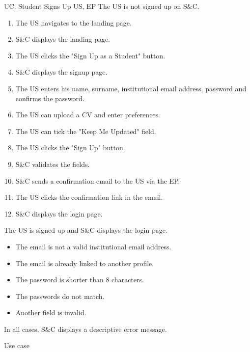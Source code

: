 \clearpage
\begin{usecase}
    {UC\theuc. Student Signs Up}
    {US, EP}
    {The US is not signed up on S\&C.}
    {\begin{enumerate}[leftmargin=*]
        \item The US navigates to the landing page.
        \item S\&C displays the landing page.
        \item The US clicks the "Sign Up as a Student" button.
        \item S\&C displays the signup page.
        \item The US enters his name, surname, institutional email address, password and confirms the password.
        \item The US can upload a CV and enter preferences.
        \item The US can tick the "Keep Me Updated" field.
        \item The US clicks the "Sign Up" button.
        \item S\&C validates the fields.
        \item S\&C sends a confirmation email to the US via the EP.
        \item The US clicks the confirmation link in the email.
        \item S\&C displays the login page.
    \end{enumerate}}
    {The US is signed up and S\&C displays the login page.}
    {\begin{itemize}[leftmargin=*, label=\tiny\textbullet]
        \item The email is not a valid institutional email address.
        \item The email is already linked to another profile.
        \item The password is shorter than 8 characters.
        \item The passwords do not match.
        \item Another field is invalid.
    \end{itemize}
    In all cases, S\&C displays a descriptive error message.}
    {Use case \theuc}
\end{usecase}

